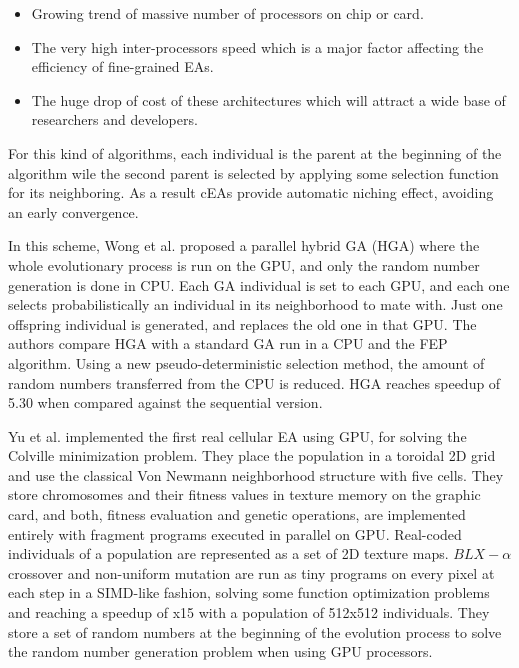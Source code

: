 \documentclass[prodmode,acmtecs]{acmsmall}
\begin{document}
\begin{itemize}
 \item Growing trend of massive number of processors on chip or card. 
\item The very high inter-processors speed which is a major factor affecting the efficiency of fine-grained EAs. 
\item The huge drop of cost of these architectures which will attract a wide base of researchers and developers.
\end{itemize}

For this kind of algorithms, each individual is the parent at the beginning of the algorithm wile the second parent is selected by applying some selection function for its neighboring. As a result cEAs provide automatic niching effect, avoiding an early convergence. 


In this scheme, Wong et al. \cite{man-leung-wong-parallel-2006,wong-implementation-2009} proposed a parallel hybrid GA (HGA) where the whole evolutionary process is run on the GPU, and only the random number generation is done in CPU. Each GA individual is set to each GPU, and each one selects probabilistically an individual in its neighborhood to mate with. Just one offspring individual is generated, and replaces the old one in that GPU. The authors compare HGA with a standard GA run in a CPU and the FEP \cite{man-leung-wong-parallel-2005} algorithm. Using a new pseudo-deterministic selection method, the amount of random numbers transferred from the CPU is reduced. HGA reaches speedup of 5.30 when compared against the sequential version.


Yu et al. \cite{yu-parallel-2005} implemented the first real cellular EA using GPU, for solving the Colville minimization problem. They place the population in a toroidal 2D grid and use the classical Von Newmann neighborhood structure with five cells. They store chromosomes and their fitness values in texture memory on the graphic card, and both, fitness evaluation and genetic operations, are implemented entirely with fragment programs executed in parallel on GPU. Real-coded individuals of a population are represented as a set of 2D texture maps. $BLX-\alpha$ crossover and non-uniform mutation are run as tiny programs on every pixel at each step in a SIMD-like fashion, solving some function optimization problems and reaching a speedup of x15 with a population of 512x512 individuals. They store a set of random numbers at the beginning of the evolution process to solve the random number generation problem when using GPU processors. 
\end{document}
